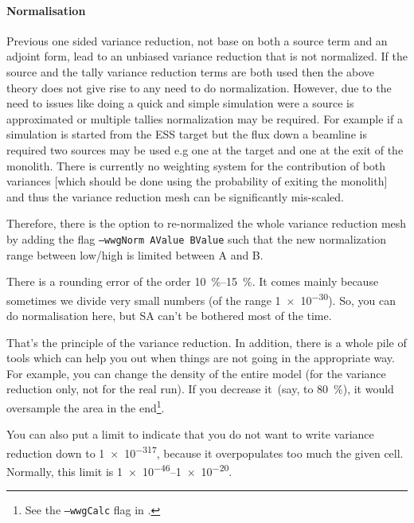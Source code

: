 \paragraph{Normalisation}

Previous one sided variance reduction, not base on both a source term
and an adjoint form, lead to an unbiased variance reduction that is
not normalized. If the source and the tally variance reduction terms
are both used then the above theory does not give rise to any need to
do normalization. However, due to the need to issues like doing a
quick and simple simulation were a source is approximated or multiple
tallies normalization may be required. For example if a simulation is
started from the ESS target but the flux down a beamline is required
two sources may be used e.g one at the target and one at the exit of
the monolith. There is currently no weighting system for the
contribution of both variances [which should be done using the
  probability of exiting the monolith] and thus the variance reduction
mesh can be significantly mis-scaled.

Therefore, there is the option to re-normalized the whole variance reduction mesh by adding the flag
{\tt --wwgNorm AValue BValue} such that the new normalization range between low/high is limited between A and B.


There is a rounding error of the order \SIrange{10}{15}{\percent}.
It comes mainly because sometimes we divide very small numbers (of the range \num[retain-unity-mantissa=false]{1e-30}). So, you can do normalisation here, but
SA can't be bothered most of the time.

\bigskip

That's the principle of the variance reduction. In addition, there is a whole pile of tools which can help you out when things
are not going in the appropriate way.
For example, you can change the density of the entire model (for the variance reduction only, not for the real run).
If you decrease it~(say, to \SI{80}{\percent}), it would oversample the area in the end\footnote{See the {\tt --wwgCalc} flag in .}.

You can also put a limit to indicate that you do not want to write variance reduction down to \num[retain-unity-mantissa=false]{1e-317}, because it overpopulates too much the given cell. Normally, this limit is \numrange[retain-unity-mantissa=false]{1e-46}{1e-20}.


